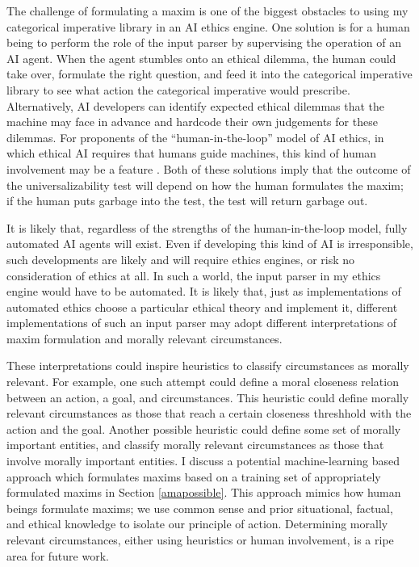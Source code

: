 \begin{isabellebody}
\begin{isamarkuptext}
The challenge of formulating a maxim is one of the biggest obstacles to using my categorical imperative library
in an AI ethics engine. One solution is for a human being to perform the role of the input
parser by supervising the operation of an AI agent. When the agent stumbles onto
an ethical dilemma, the human could take over, formulate
the right question, and feed it into the categorical imperative library to see what action the categorical 
imperative would prescribe. Alternatively, AI developers can identify expected ethical dilemmas 
that the machine may face in advance and hardcode their own judgements for these dilemmas. 
For proponents of the ``human-in-the-loop'' model of AI ethics, in which
ethical AI requires that humans guide machines, this kind of human involvement may be a feature \citep{loop}.
Both of these solutions imply that the outcome of the universalizability test will depend on how the 
human formulates the maxim; if the human puts garbage into the test, the test will return garbage out.

It is likely that, regardless of the strengths of the human-in-the-loop model, fully automated AI 
agents will exist. Even if developing this kind of AI is irresponsible,
such developments are likely and will require ethics engines, or risk no consideration of ethics at all.
In such a world, the input parser in my ethics engine would have to be automated.
It is likely that, just as implementations of automated ethics choose 
a particular ethical theory and implement it, different implementations of such an input parser may 
adopt different interpretations of maxim formulation and morally relevant circumstances. 

These interpretations could inspire heuristics to classify circumstances as morally 
relevant. For example, one such attempt could define a moral closeness relation between an action, a 
goal, and circumstances. This heuristic could define morally relevant circumstances as those that 
reach a certain closeness threshhold with the action and the goal. Another possible heuristic could 
define some set of morally important entities, and classify morally relevant circumstances as those
that involve morally important entities. I discuss a potential machine-learning based approach which formulates
maxims based on a training set of appropriately formulated maxims in Section \ref{amapossible}. This 
approach mimics how human beings formulate maxims; we use common sense and prior situational, 
factual, and ethical knowledge to isolate our principle of action. Determining morally relevant circumstances, 
either using heuristics or human involvement, is a ripe area for future work.


\end{isamarkuptext}
\end{isabellebody}
